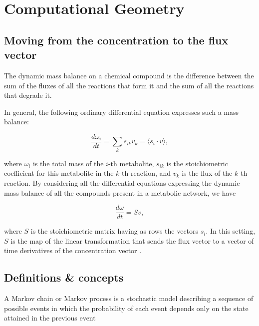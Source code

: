 \chapter{Computational Geometry}
\label{app:comp_geom_intro}

\section{Moving from the concentration to the flux vector}
\label{}


The dynamic mass balance on a chemical compound
is the difference between the sum of the  fluxes of all the reactions that form it
and the sum of all the reactions that degrade it.

In general, the following ordinary differential equation expresses such a mass balance:

\begin{equation}
\frac{d\omega_i}{dt} = \sum_{k} s_{ik} v_{k} = \langle {s_i} \cdot v \rangle ,
\end{equation}

where $\omega_i$ is the total mass of the $i$-th metabolite, $s_{ik}$ is the stoichiometric coefficient for this metabolite in the $k$-th
reaction, and $v_k$ is the flux of the $k$-th reaction. By
considering all the differential equations expressing the dynamic mass balance
of all the compounds present in a metabolic network, we have

\begin{equation}
\frac{d\omega}{dt} = S v ,
\end{equation}

where $S$ is the stoichiometric matrix
having as rows the  vectors $s_i$.
In this setting, $S$ is the map of the linear  transformation
that sends the flux vector to a vector of time derivatives of the concentration vector
\cite{palsson2015systems}.




\section{Definitions \& concepts}
\label{}


   \begin{definition}
      A Markov chain or Markov process is a stochastic model describing a sequence of possible events in which the probability of each event depends only on the state attained in the previous event
   \end{definition}


